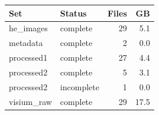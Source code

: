 \begin{tabular}{llrr}
\toprule
Set & Status & Files & GB \\
\midrule
he\_images & complete & 29 & 5.1 \\
metadata & complete & 2 & 0.0 \\
processed1 & complete & 27 & 4.4 \\
processed2 & complete & 5 & 3.1 \\
processed2 & incomplete & 1 & 0.0 \\
visium\_raw & complete & 29 & 17.5 \\
\bottomrule
\end{tabular}
